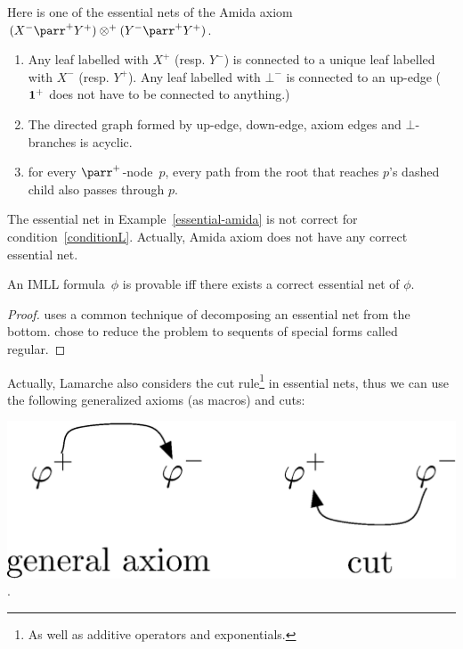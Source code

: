  \begin{example} \label{essential-amida}
  Here is one of the essential nets of
  the Amida axiom $(X^-\parr^+Y^+)\otimes^+(Y^-\parr^+ Y^+)$.
 \end{example}

  \begin{definition}
\begin{enumerate}
 \item Any leaf labelled with $X^+$ (resp. $Y^-$) is connected to a
       unique leaf labelled with $X^-$ (resp. $Y^+$).
       Any leaf labelled with $\bot^-$ is connected to an up-edge
       ($\mathbf{1}^+$ does not have to be connected to anything.)
 \item The directed graph formed by up-edge, down-edge, axiom edges and
       $\bot$-branches is acyclic.
 \item \label{conditionL}
       for every $\parr^+$-node~$p$, every path from the root that reaches
       $p$'s dashed child also passes through $p$.
\end{enumerate}
  \end{definition}
The essential net in Example~\ref{essential-amida} is not correct for
condition~\ref{conditionL}.  Actually, Amida axiom does not have
any correct essential net.

 \begin{theorem}
  An IMLL formula~$\phi$ is provable iff there exists a correct essential net
  of $\phi$.
 \end{theorem}
 \begin{proof}
  \citet{lamarche2008} uses a common technique of decomposing an
  essential net from the bottom.
  \citet{murawski2003} chose to reduce the problem to sequents of special forms
  called regular.
 \end{proof}

 Actually, Lamarche also considers the cut rule\footnote{As well as
 additive operators and exponentials.} in essential nets, thus
 we can use the following generalized axioms (as macros) and cuts:
 \begin{center}
  \includegraphics[scale=0.4]{general-axiom-cut.eps}\enspace.
 \end{center}

